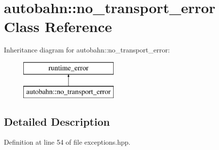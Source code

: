 \hypertarget{classautobahn_1_1no__transport__error}{}\section{autobahn\+:\+:no\+\_\+transport\+\_\+error Class Reference}
\label{classautobahn_1_1no__transport__error}
Inheritance diagram for autobahn\+:\+:no\+\_\+transport\+\_\+error\+:\begin{figure}[H]
\begin{center}
\leavevmode
\includegraphics[height=2.000000cm]{classautobahn_1_1no__transport__error}
\end{center}
\end{figure}


\subsection{Detailed Description}


Definition at line 54 of file exceptions.\+hpp.


